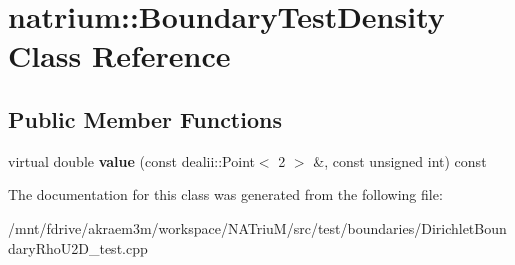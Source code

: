 \hypertarget{classnatrium_1_1BoundaryTestDensity}{
\section{natrium::BoundaryTestDensity Class Reference}
\label{classnatrium_1_1BoundaryTestDensity}
}
\subsection*{Public Member Functions}
\begin{DoxyCompactItemize}
\item 
\hypertarget{classnatrium_1_1BoundaryTestDensity_af485f34989fac863e20d1827f379cfa6}{
virtual double {\bfseries value} (const dealii::Point$<$ 2 $>$ \&, const unsigned int) const }
\label{classnatrium_1_1BoundaryTestDensity_af485f34989fac863e20d1827f379cfa6}

\end{DoxyCompactItemize}


The documentation for this class was generated from the following file:\begin{DoxyCompactItemize}
\item 
/mnt/fdrive/akraem3m/workspace/NATriuM/src/test/boundaries/DirichletBoundaryRhoU2D\_\-test.cpp\end{DoxyCompactItemize}
